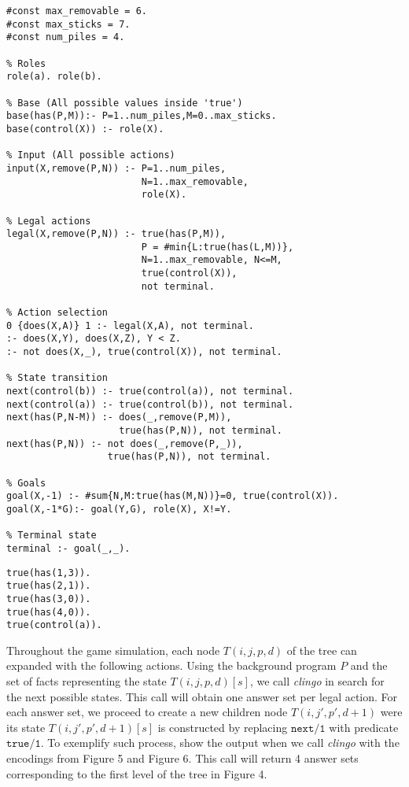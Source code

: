 \begin{center}
    \begin{lstlisting}[] 
#const max_removable = 6. 
#const max_sticks = 7. 
#const num_piles = 4.

% Roles
role(a). role(b).

% Base (All possible values inside 'true')
base(has(P,M)):- P=1..num_piles,M=0..max_sticks.
base(control(X)) :- role(X).

% Input (All possible actions)
input(X,remove(P,N)) :- P=1..num_piles, 
                        N=1..max_removable,
                        role(X).

% Legal actions
legal(X,remove(P,N)) :- true(has(P,M)), 
                        P = #min{L:true(has(L,M))},
                        N=1..max_removable, N<=M, 
                        true(control(X)), 
                        not terminal.

% Action selection
0 {does(X,A)} 1 :- legal(X,A), not terminal.
:- does(X,Y), does(X,Z), Y < Z.
:- not does(X,_), true(control(X)), not terminal.

% State transition
next(control(b)) :- true(control(a)), not terminal.
next(control(a)) :- true(control(b)), not terminal.
next(has(P,N-M)) :- does(_,remove(P,M)), 
                    true(has(P,N)), not terminal.
next(has(P,N)) :- not does(_,remove(P,_)), 
                  true(has(P,N)), not terminal.

% Goals
goal(X,-1) :- #sum{N,M:true(has(M,N))}=0, true(control(X)).
goal(X,-1*G):- goal(Y,G), role(X), X!=Y.

% Terminal state
terminal :- goal(_,_).
    \end{lstlisting}
\end{center}

\begin{center}
    \begin{lstlisting}[] 
true(has(1,3)).
true(has(2,1)).
true(has(3,0)).
true(has(4,0)).
true(control(a)).
    \end{lstlisting}
\end{center}

Throughout the game simulation, each node $T(i,j,p,d)$ of the tree can expanded with the following actions. Using the background program $P$ and the set of facts representing the state $T(i,j,p,d)[s]$, we call \textit{clingo} in search for the next possible states. This call will obtain one answer set per legal action. For each answer set, we proceed to create a new children node $T(i,j',p',d+1)$ were its state $T(i,j',p',d+1)[s]$ is constructed by replacing $\texttt{next/1}$ with predicate $\texttt{true/1}$. To exemplify such process, show the output when we call \textit{clingo} with the encodings from Figure 5 and Figure 6. This call will return 4 answer sets corresponding to the first level of the tree in Figure 4.

